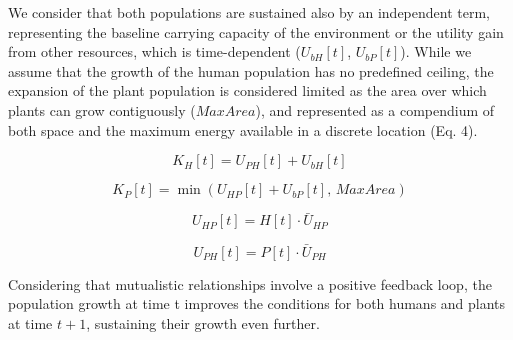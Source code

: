 \documentclass[
]{book}
\begin{document}
We consider that both populations are sustained also by an independent term, representing the baseline carrying capacity of the environment or the utility gain from other resources, which is time-dependent (\(U_{bH}[t]\), \(U_{bP}[t]\)). While we assume that the growth of the human population has no predefined ceiling, the expansion of the plant population is considered limited as the area over which plants can grow contiguously (\(MaxArea\)), and represented as a compendium of both space and the maximum energy available in a discrete location (Eq. 4).

\begin{equation}
\tag{Eq. 3}
K_{H}[t]=U_{PH}[t]+U_{bH}[t]
\end{equation}

\begin{equation}
\tag{Eq. 4}
K_{P}[t]=\min(U_{HP}[t]+U_{bP}[t],\, MaxArea)
\end{equation}

\begin{equation}
\tag{Eq. 5}
U_{HP}[t]=H[t]\cdot \bar{U}_{HP}
\end{equation}

\begin{equation}
\tag{Eq. 6}
U_{PH}[t]=P[t]\cdot \bar{U}_{PH}
\end{equation}

Considering that mutualistic relationships involve a positive feedback loop, the population growth at time t improves the conditions for both humans and plants at time \(t + 1\), sustaining their growth even further.
\end{document}

